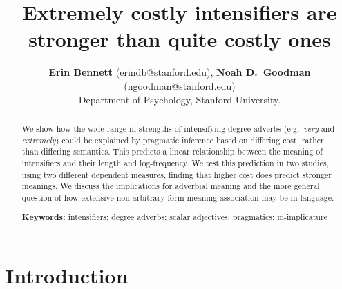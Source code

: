 \documentclass[10pt,letterpaper]{article}
\title{Extremely costly intensifiers are stronger than quite costly ones}
\author{{\large \bf Erin Bennett} (erindb@stanford.edu), {\large \bf Noah D.~Goodman} (ngoodman@stanford.edu)\\
  Department of Psychology, Stanford University.}
\newcommand{\w}[1]{\emph{#1}}
\begin{document}
\maketitle

\begin{abstract}

We show how the wide range in strengths of intensifying degree adverbs (e.g.~\w{very} and \w{extremely}) could be explained by pragmatic inference based on differing cost, rather than differing semantics.
This predicts a linear relationship between the meaning of intensifiers and their length and log-frequency.
We test this prediction in two studies, using two different dependent measures, finding that higher cost does predict stronger meanings.
We discuss the implications for
adverbial meaning
and the more general question of how extensive non-arbitrary form-meaning association may be in language.

\textbf{Keywords:} 
intensifiers; degree adverbs; scalar adjectives; pragmatics; m-implicature
\end{abstract}

\section{Introduction}
\end{document}
